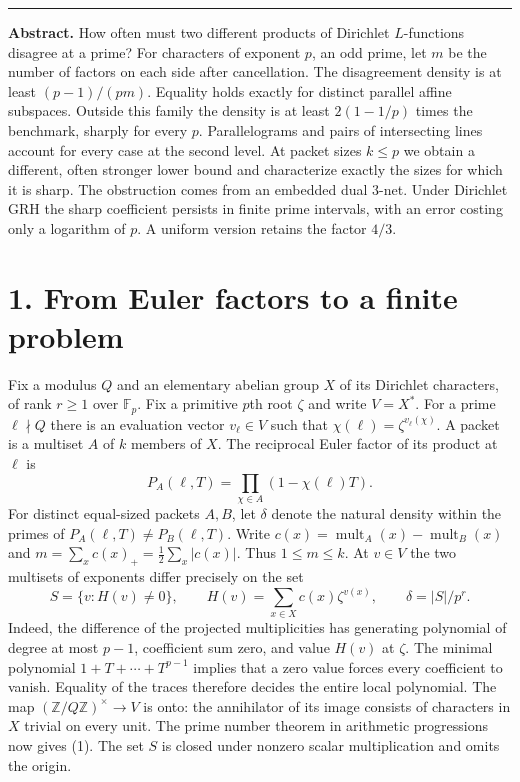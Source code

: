 \documentclass[11pt,letterpaper]{article}
\newcommand{\F}{\mathbb F}
\newcommand{\Z}{\mathbb Z}
\newcommand{\heading}[1]{\section*{\color{ink}#1}}
\begin{document}
\thispagestyle{plain}
\par
\vspace{8pt}
\par
\vspace{3pt}\par
\vspace{8pt}\noindent\rule{\linewidth}{0.5pt}

\noindent\textbf{Abstract.}
How often must two different products of Dirichlet $L$-functions disagree at a prime?
For characters of exponent $p$, an odd prime, let $m$ be the number of factors on each side after cancellation. The disagreement density is at least $(p-1)/(pm)$. Equality holds exactly for distinct parallel affine subspaces. Outside this family the density is at least $2(1-1/p)$ times the benchmark, sharply for every $p$. Parallelograms and pairs of intersecting lines account for every case at the second level. At packet sizes $k\le p$ we obtain a different, often stronger lower bound and characterize exactly the sizes for which it is sharp. The obstruction comes from an embedded dual $3$-net. Under Dirichlet GRH the sharp coefficient persists in finite prime intervals, with an error costing only a logarithm of $p$. A uniform version retains the factor $4/3$.

\heading{1. From Euler factors to a finite problem}
Fix a modulus $Q$ and an elementary abelian group $X$ of its Dirichlet characters, of rank $r\ge1$ over $\F_p$. Fix a primitive $p$th root $\zeta$ and write $V=X^*$. For a prime $\ell\nmid Q$ there is an evaluation vector $v_\ell\in V$ such that $\chi(\ell)=\zeta^{v_\ell(\chi)}$. A packet is a multiset $A$ of $k$ members of $X$. The reciprocal Euler factor of its product at $\ell$ is
\[
 P_A(\ell,T)=\prod_{\chi\in A}(1-\chi(\ell)T).
\]
For distinct equal-sized packets $A,B$, let $\delta$ denote the natural density within the primes of $P_A(\ell,T)\ne P_B(\ell,T)$. Write $c(x)=\operatorname{mult}_A(x)-\operatorname{mult}_B(x)$ and $m=\sum_x c(x)_+=\tfrac12\sum_x|c(x)|$. Thus $1\le m\le k$. At $v\in V$ the two multisets of exponents differ precisely on the set
\[
 S=\{v:H(v)\ne0\},\qquad H(v)=\sum_{x\in X}c(x)\zeta^{v(x)},\qquad
 \delta=|S|/p^r.                                                    \tag{1}
\]
Indeed, the difference of the projected multiplicities has generating polynomial of degree at most $p-1$, coefficient sum zero, and value $H(v)$ at $\zeta$. The minimal polynomial $1+T+\cdots+T^{p-1}$ implies that a zero value forces every coefficient to vanish. Equality of the traces therefore decides the entire local polynomial. The map $(\Z/Q\Z)^\times\to V$ is onto: the annihilator of its image consists of characters in $X$ trivial on every unit. The prime number theorem in arithmetic progressions now gives (1). The set $S$ is closed under nonzero scalar multiplication and omits the origin.
\end{document}
